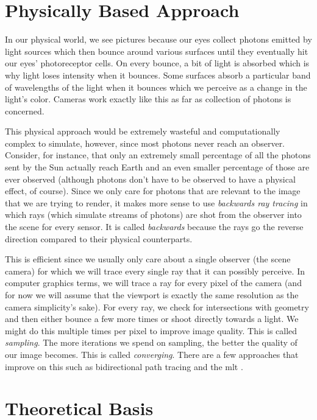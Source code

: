 \documentclass[
  twoside,
  11pt, a4paper,
  footinclude=true,
  headinclude=true,
  cleardoublepage=empty
]{scrreprt}
\begin{document}
\section{Physically Based Approach}
In our physical world, we see pictures because our eyes collect photons emitted by light
sources which then bounce around various surfaces until they eventually hit our eyes'
photoreceptor cells. On every bounce, a bit of light is absorbed which is why light loses intensity
when it bounces. Some surfaces absorb a particular band of wavelengths of the light when it bounces
which we perceive as a change in the light's color. Cameras work exactly like this as far as
collection of photons is concerned.

This physical approach would be extremely wasteful and
computationally complex to simulate, however, since most photons never reach an observer. Consider,
for instance, that only an extremely small percentage of all the photons sent by the Sun actually
reach Earth and an even smaller percentage of those are ever observed (although photons
don't have to be observed to have a physical effect, of course). Since we only care for photons that
are relevant to the image that we are trying to render, it makes more sense to use
\emph{backwards ray tracing} in which rays (which simulate streams of photons) are shot from the
observer into the scene for every sensor. It is called \textit{backwards} because the rays go
the reverse direction compared to their physical counterparts.

This is efficient since we usually only care about a
single observer (the scene camera) for which we will trace every single ray that it can possibly
perceive. In computer graphics terms, we will trace a ray for every pixel of the camera (and for
now we will assume that the viewport is exactly the same resolution as the camera simplicity's
sake). For every ray, we check for intersections with geometry and then either bounce a few more
times or shoot directly towards a light. We might do this multiple times per pixel to improve image
quality. This is called \emph{sampling}. The more iterations we spend on sampling, the better the
quality of our image becomes. This is called \emph{converging}.
There are a few approaches that improve on this such as bidirectional path tracing
\cite{techreport:pbr} and the \ac{mlt} \cite{inproceedings:metropolis}.

\section{Theoretical Basis}
\end{document}
